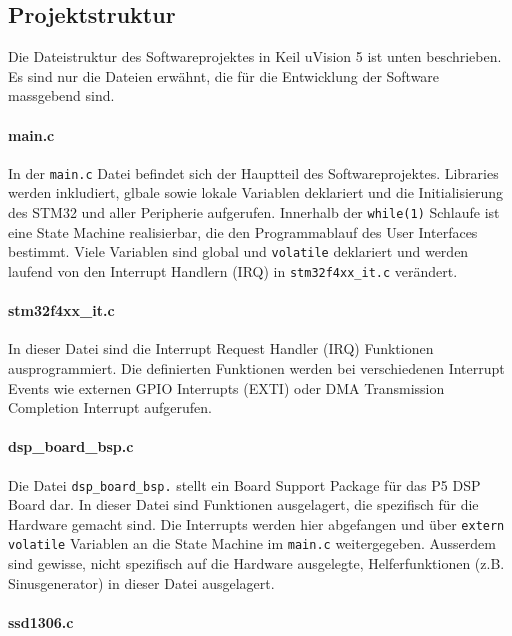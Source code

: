 \subsection{Projektstruktur}
\label{sec:SWProjekt}

Die Dateistruktur des Softwareprojektes in Keil uVision 5 ist unten beschrieben. 
Es sind nur die Dateien erwähnt, die für die Entwicklung der Software massgebend sind.


\paragraph{main.c}

In der \texttt{main.c} Datei befindet sich der Hauptteil des Softwareprojektes.
Libraries werden inkludiert, glbale sowie lokale Variablen deklariert und die Initialisierung des STM32 und aller Peripherie aufgerufen.
Innerhalb der \texttt{while(1)} Schlaufe ist eine State Machine realisierbar, die den Programmablauf des User Interfaces bestimmt.
Viele Variablen sind global und \texttt{volatile} deklariert und werden laufend von den Interrupt Handlern (IRQ) in \texttt{stm32f4xx\_it.c} verändert.


\paragraph{stm32f4xx\_it.c}

In dieser Datei sind die Interrupt Request Handler (IRQ) Funktionen ausprogrammiert.
Die definierten Funktionen werden bei verschiedenen Interrupt Events wie externen GPIO Interrupts (EXTI) oder DMA Transmission Completion Interrupt aufgerufen.


\paragraph{dsp\_board\_bsp.c}

Die Datei \texttt{dsp\_board\_bsp.} stellt ein Board Support Package für das P5 DSP Board dar.
In dieser Datei sind Funktionen ausgelagert, die spezifisch für die Hardware gemacht sind.
Die Interrupts werden hier abgefangen und über \texttt{extern volatile} Variablen an die State Machine im \texttt{main.c} weitergegeben.
Ausserdem sind gewisse, nicht spezifisch auf die Hardware ausgelegte, Helferfunktionen (z.B. Sinusgenerator) in dieser Datei ausgelagert.


\paragraph{ssd1306.c}

